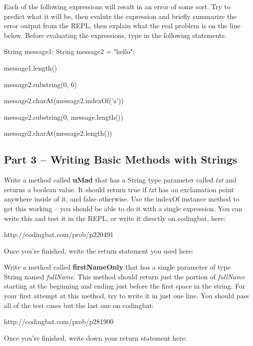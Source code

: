 \begin{eval}
Each of the following expressions will result in an error of some sort. Try to predict what it will be, then evalute the expression and briefly summarize the error output from the REPL, then  explain what the real problem is on the line below. Before evaluating the expressions, type in the following statements:

\begin{code}
String message1;
String message2 = "hello";
\end{code}

\begin{sevalenum}
\item message1.length()
\evallinethree
\item message2.substring(0, 6)
\evallinethree
\item message2.charAt(message2.indexOf('z'))
\evallinethree
\item message2.substring(0, message.length())
\evallinethree
\item message2.charAt(message2.length())
\evallinethree
\end{sevalenum}
\end{eval}


\initialbox

\subsection{Part 3 -- Writing Basic Methods with Strings}

\begin{exer}
Write a method called \textbf{uMad} that has a String type parameter called \textit{txt} and returns a boolean value. It should return true if \textit{txt} has an exclamation point anywhere inside of it, and false otherwise. Use the indexOf instance method to get this working -- you should be able to do it with a single expression. You can write this and test it in the REPL, or write it directly on codingbat, here:

http://codingbat.com/prob/p220491

Once you're finished, write the return statement you used here:

\evalline

\end{exer}

\begin{exer}
Write a method called \textbf{firstNameOnly} that has a single parameter of type String named \textit{fullName}. This method should return just the portion of \textit{fullName} starting at the beginning and ending just before the first space in the string. For your first attempt at this method, try to write it in just one line. You should pass all of the test cases but the last one on codingbat:

http://codingbat.com/prob/p281900

Once you're finished, write down your return statement here:

\evalline

\end{exer}


